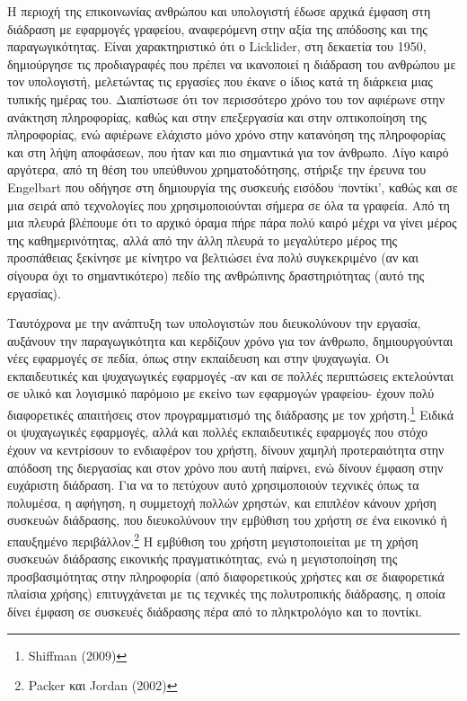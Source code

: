 \documentclass[
]{article}
\begin{document}
Η περιοχή της επικοινωνίας ανθρώπου και υπολογιστή έδωσε αρχικά έμφαση
στη διάδραση με εφαρμογές γραφείου, αναφερόμενη στην αξία της απόδοσης
και της παραγωγικότητας. Είναι χαρακτηριστικό ότι ο Licklider, στη
δεκαετία του 1950, δημιούργησε τις προδιαγραφές που πρέπει να ικανοποιεί
η διάδραση του ανθρώπου με τον υπολογιστή, μελετώντας τις εργασίες που
έκανε ο ίδιος κατά τη διάρκεια μιας τυπικής ημέρας του. Διαπίστωσε ότι
τον περισσότερο χρόνο του τον αφιέρωνε στην ανάκτηση πληροφορίας, καθώς
και στην επεξεργασία και στην οπτικοποίηση της πληροφορίας, ενώ αφιέρωνε
ελάχιστο μόνο χρόνο στην κατανόηση της πληροφορίας και στη λήψη
αποφάσεων, που ήταν και πιο σημαντικά για τον άνθρωπο. Λίγο καιρό
αργότερα, από τη θέση του υπεύθυνου χρηματοδότησης, στήριξε την έρευνα
του Engelbart που οδήγησε στη δημιουργία της συσκευής εισόδου `ποντίκι',
καθώς και σε μια σειρά από τεχνολογίες που χρησιμοποιούνται σήμερα σε
όλα τα γραφεία. Από τη μια πλευρά βλέπουμε ότι το αρχικό όραμα πήρε πάρα
πολύ καιρό μέχρι να γίνει μέρος της καθημερινότητας, αλλά από την άλλη
πλευρά το μεγαλύτερο μέρος της προσπάθειας ξεκίνησε με κίνητρο να
βελτιώσει ένα πολύ συγκεκριμένο (αν και σίγουρα όχι το σημαντικότερο)
πεδίο της ανθρώπινης δραστηριότητας (αυτό της εργασίας).

Ταυτόχρονα με την ανάπτυξη των υπολογιστών που διευκολύνουν την εργασία,
αυξάνουν την παραγωγικότητα και κερδίζουν χρόνο για τον άνθρωπο,
δημιουργούνται νέες εφαρμογές σε πεδία, όπως στην εκπαίδευση και στην
ψυχαγωγία. Οι εκπαιδευτικές και ψυχαγωγικές εφαρμογές -αν και σε πολλές
περιπτώσεις εκτελούνται σε υλικό και λογισμικό παρόμοιο με εκείνο των
εφαρμογών γραφείου- έχουν πολύ διαφορετικές απαιτήσεις στον
προγραμματισμό της διάδρασης με τον χρήστη.\footnote{Shiffman (2009)}
Ειδικά οι ψυχαγωγικές εφαρμογές, αλλά και πολλές εκπαιδευτικές εφαρμογές
που στόχο έχουν να κεντρίσουν το ενδιαφέρον του χρήστη, δίνουν χαμηλή
προτεραιότητα στην απόδοση της διεργασίας και στον χρόνο που αυτή
παίρνει, ενώ δίνουν έμφαση στην ευχάριστη διάδραση. Για να το πετύχουν
αυτό χρησιμοποιούν τεχνικές όπως τα πολυμέσα, η αφήγηση, η συμμετοχή
πολλών χρηστών, και επιπλέον κάνουν χρήση συσκευών διάδρασης, που
διευκολύνουν την εμβύθιση του χρήστη σε ένα εικονικό ή επαυξημένο
περιβάλλον.\footnote{Packer και Jordan (2002)} Η εμβύθιση του χρήστη
μεγιστοποιείται με τη χρήση συσκευών διάδρασης εικονικής
πραγματικότητας, ενώ η μεγιστοποίηση της προσβασιμότητας στην πληροφορία
(από διαφορετικούς χρήστες και σε διαφορετικά πλαίσια χρήσης)
επιτυγχάνεται με τις τεχνικές της πολυτροπικής διάδρασης, η οποία δίνει
έμφαση σε συσκευές διάδρασης πέρα από το πληκτρολόγιο και το ποντίκι.
\end{document}
